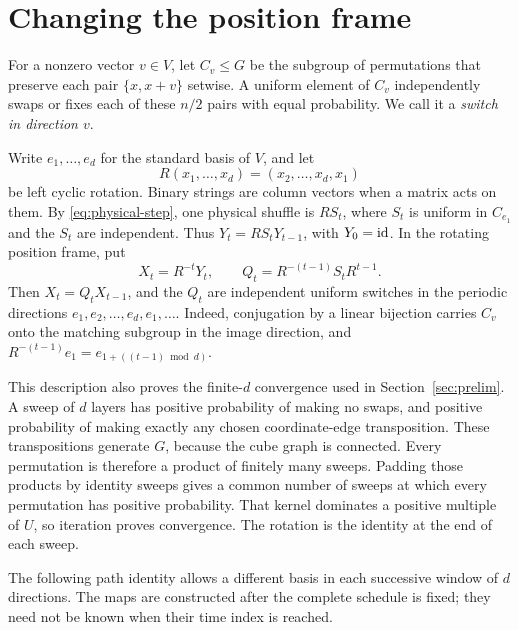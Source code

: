 \section{Changing the position frame}
\label{sec:frames}

For a nonzero vector $v\in V$, let $C_v\le G$ be the subgroup of
permutations that preserve each pair $\{x,x+v\}$ setwise. A uniform
element of $C_v$ independently swaps or fixes each of these $n/2$
pairs with equal probability. We call it a \emph{switch in direction
$v$}.

Write $e_1,\ldots,e_d$ for the standard basis of $V$, and let
\[
 R(x_1,\ldots,x_d)=(x_2,\ldots,x_d,x_1)
\]
be left cyclic rotation. Binary strings are column vectors when a
matrix acts on them. By \eqref{eq:physical-step}, one physical
shuffle is $RS_t$, where $S_t$ is uniform in $C_{e_1}$ and the
$S_t$ are independent. Thus $Y_t=RS_tY_{t-1}$, with $Y_0=\mathrm{id}$.
In the rotating position frame, put
\begin{equation}\label{eq:frames:cyclic}
 X_t=R^{-t}Y_t,\qquad
 Q_t=R^{-(t-1)}S_tR^{t-1}.
\end{equation}
Then $X_t=Q_tX_{t-1}$, and the $Q_t$ are independent uniform
switches in the periodic directions
$e_1,e_2,\ldots,e_d,e_1,\ldots$. Indeed, conjugation by a linear
bijection carries $C_v$ onto the matching subgroup in the image
direction, and $R^{-(t-1)}e_1=e_{1+((t-1)\bmod d)}$.

This description also proves the finite-$d$ convergence used in
Section~\ref{sec:prelim}. A sweep of $d$ layers has positive
probability of making no swaps, and positive probability of making
exactly any chosen coordinate-edge transposition. These
transpositions generate $G$, because the cube graph is connected.
Every permutation is therefore a product of finitely many sweeps.
Padding those products by identity sweeps gives a common number of
sweeps at which every permutation has positive probability. That
kernel dominates a positive multiple of $U$, so iteration proves
convergence. The rotation is the identity at the end of each sweep.

The following path identity allows a different basis in each
successive window of $d$ directions. The maps are constructed after
the complete schedule is fixed; they need not be known when their
time index is reached.

